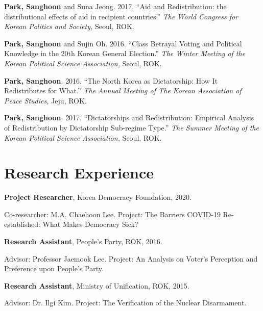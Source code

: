 \documentclass[margin,line]{res}
\begin{document}
\begin{resume}
\vspace{-.25cm}
{\bf Park, Sanghoon} and Suna Jeong. {2017.} {``Aid and Redistribution: the distributional effects of aid in recipient countries.''} {\it The World Congress for Korean Politics and Society,} Seoul, ROK.

\vspace{-.25cm}
{\bf Park, Sanghoon} and Sujin Oh. {2016.} {``Class Betrayal Voting and Political Knowledge in the 20th Korean General Election.''} {\it The Winter Meeting of the Korean Political Science Association,} Seoul, ROK.

\vspace{-.25cm}
{\bf Park, Sanghoon}. {2016.} {``The North Korea as Dictatorship: How It Redistributes for What.''} {\it The Annual Meeting of The Korean Association of Peace Studies,} Jeju, ROK.

\vspace{-.25cm}
{\bf Park, Sanghoon}. {2017.} {``Dictatorships and Redistribution: Empirical Analysis of Redistribution by Dictatorship Sub-regime Type.''} {\it The Summer Meeting of the Korean Political Science Association,} Seoul, ROK.

\section{\sc Research Experience}


{\bf Project Researcher}, Korea Democracy Foundation, 2020.

\vspace{-.43cm}
{Co-researcher: M.A. Chaehoon Lee. Project: The Barriers COVID-19 Re-established: What Makes Democracy Sick?} 

\vspace{-.1cm}
{\bf Research Assistant}, People's Party, ROK, 2016.

\vspace{-.43cm}
{Advisor: Professor Jaemook Lee. Project: An Analysis on Voter’s Perception and Preference upon People’s Party.}

\vspace{-.1cm}
{\bf Research Assistant}, Ministry of Unification, ROK, 2015.

\vspace{-.43cm}
{Advisor: Dr. Ilgi Kim. Project: The Verification of the Nuclear Disarmament.}


\end{resume}
\end{document}
